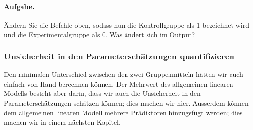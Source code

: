 \documentclass[oneside, 10pt]{book}\usepackage[]{graphicx}\usepackage[]{xcolor}
\begin{document}
\paragraph{Aufgabe.} Ändern Sie die Befehle oben, sodass nun die Kontrollgruppe als 1 bezeichnet wird und die Experimentalgruppe als 0. Was ändert sich im Output?

\subsubsection{Unsicherheit in den Parameterschätzungen quantifizieren}
Den minimalen Unterschied zwischen den zwei Gruppenmitteln hätten wir auch einfach
von Hand berechnen können. Der Mehrwert des allgemeinen linearen Modells besteht
aber darin, dass wir auch die Unsicherheit in den Parameterschätzungen schätzen
können; dies machen wir hier. Ausserdem können dem allgemeinen linearen Modell
mehrere Prädiktoren hinzugefügt werden; dies machen wir in einem nächsten Kapitel.
\end{document}
